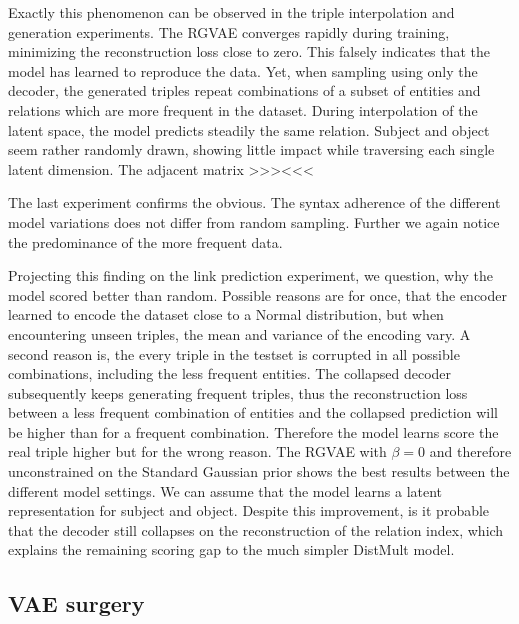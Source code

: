 Exactly this phenomenon can be observed in the triple interpolation and generation experiments. The RGVAE converges rapidly during training, minimizing the reconstruction loss close to zero. This falsely indicates that the model has learned to reproduce the data. Yet, when sampling using only the decoder, the generated triples repeat combinations of a subset of entities and relations which are more frequent in the dataset. During interpolation of the latent space, the model predicts steadily the same relation. Subject and object seem rather randomly drawn, showing little impact while traversing each single latent dimension. The adjacent matrix >>><<<

The last experiment confirms the obvious. The syntax adherence of the different model variations does not differ from random sampling. Further we again notice the predominance of the more frequent data.


Projecting this finding on the link prediction experiment, we question, why the model scored better than random. Possible reasons are for once, that the encoder learned to encode the dataset close to a Normal distribution, but when encountering unseen triples, the mean and variance of the encoding vary. A second reason is, the every triple in the testset is corrupted in all possible combinations, including the less frequent entities. The collapsed decoder subsequently keeps generating frequent triples, thus the reconstruction loss between a less frequent combination of entities and the collapsed prediction will be higher than for a frequent combination. Therefore the model learns score the real triple higher but for the wrong reason. The RGVAE with $\beta = 0$ and therefore unconstrained on the Standard Gaussian prior shows the best results between the different model settings. We can assume that the model learns a latent representation for subject and object. Despite this improvement, is it probable that the decoder still collapses on the reconstruction of the relation index, which explains the remaining scoring gap to the much simpler DistMult model.


\subsection{VAE surgery}
\label{ssec7:solutions}

